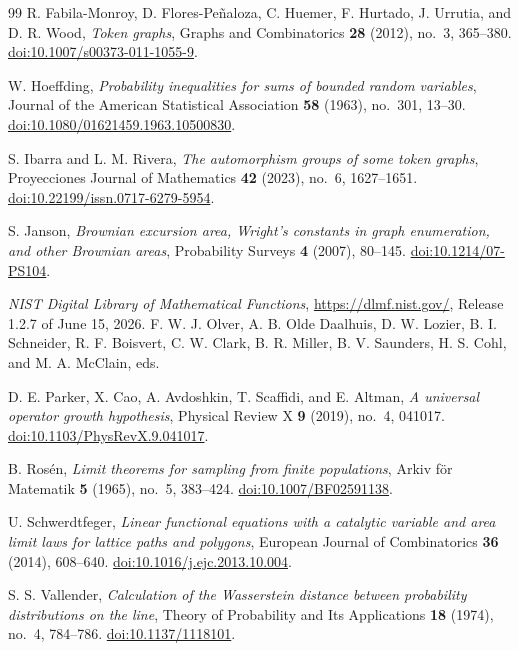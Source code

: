 \documentclass[twoside,10pt]{article}
\numberwithin{equation}{section}
\theoremstyle{slbody}
\theoremstyle{definition}
\theoremstyle{remark}
\newcommand{\1}{\mathbf{1}}
\begin{document}
\begin{thebibliography}{99}
R. Fabila-Monroy, D. Flores-Pe\~naloza, C. Huemer, F. Hurtado, J. Urrutia,
and D. R. Wood,
\emph{Token graphs},
Graphs and Combinatorics \textbf{28} (2012), no.~3, 365--380.
\href{https://doi.org/10.1007/s00373-011-1055-9}%
{doi:10.1007/s00373-011-1055-9}.

W. Hoeffding,
\emph{Probability inequalities for sums of bounded random variables},
Journal of the American Statistical Association \textbf{58} (1963), no.~301,
13--30.
\href{https://doi.org/10.1080/01621459.1963.10500830}%
{doi:10.1080/01621459.1963.10500830}.

S. Ibarra and L. M. Rivera,
\emph{The automorphism groups of some token graphs},
Proyecciones Journal of Mathematics \textbf{42} (2023), no.~6, 1627--1651.
\href{https://doi.org/10.22199/issn.0717-6279-5954}%
{doi:10.22199/issn.0717-6279-5954}.

S. Janson,
\emph{Brownian excursion area, Wright's constants in graph enumeration, and
other Brownian areas},
Probability Surveys \textbf{4} (2007), 80--145.
\href{https://doi.org/10.1214/07-PS104}{doi:10.1214/07-PS104}.

\emph{NIST Digital Library of Mathematical Functions},
\url{https://dlmf.nist.gov/}, Release 1.2.7 of June 15, 2026.
F. W. J. Olver, A. B. Olde Daalhuis, D. W. Lozier, B. I. Schneider,
R. F. Boisvert, C. W. Clark, B. R. Miller, B. V. Saunders, H. S. Cohl,
and M. A. McClain, eds.

D. E. Parker, X. Cao, A. Avdoshkin, T. Scaffidi, and E. Altman,
\emph{A universal operator growth hypothesis},
Physical Review X \textbf{9} (2019), no.~4, 041017.
\href{https://doi.org/10.1103/PhysRevX.9.041017}%
{doi:10.1103/PhysRevX.9.041017}.

B. Ros\'en,
\emph{Limit theorems for sampling from finite populations},
Arkiv f\"or Matematik \textbf{5} (1965), no.~5, 383--424.
\href{https://doi.org/10.1007/BF02591138}{doi:10.1007/BF02591138}.

U. Schwerdtfeger,
\emph{Linear functional equations with a catalytic variable and area limit
laws for lattice paths and polygons},
European Journal of Combinatorics \textbf{36} (2014), 608--640.
\href{https://doi.org/10.1016/j.ejc.2013.10.004}{doi:10.1016/j.ejc.2013.10.004}.

S. S. Vallender,
\emph{Calculation of the Wasserstein distance between probability
distributions on the line},
Theory of Probability and Its Applications \textbf{18} (1974), no.~4,
784--786.
\href{https://doi.org/10.1137/1118101}{doi:10.1137/1118101}.


\end{thebibliography}
\end{document}

